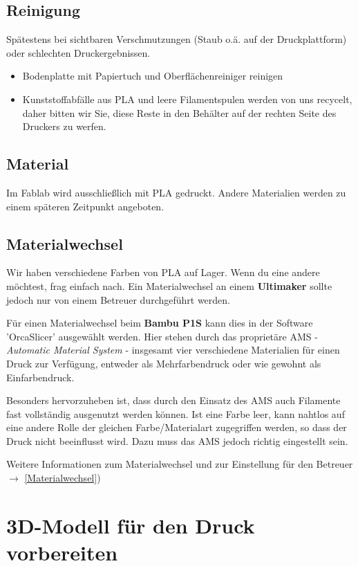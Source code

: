 \documentclass{\basedir/fablab-document}
\begin{document}
\subsection{Reinigung} \label{Reinigung}

Spätestens bei sichtbaren Verschmutzungen (Staub o.ä. auf der Druckplattform) oder schlechten Druckergebnissen.

\begin{itemize}
 \item Bodenplatte mit Papiertuch und Oberflächenreiniger reinigen
 \item Kunststoffabfälle aus PLA und leere Filamentspulen werden von uns recycelt, daher bitten wir Sie, diese Reste in den Behälter auf der rechten Seite des Druckers zu werfen.
\end{itemize}

\subsection{Material}
Im Fablab wird ausschließlich mit PLA gedruckt. Andere Materialien werden zu einem späteren Zeitpunkt angeboten.

\subsection{Materialwechsel}
Wir haben verschiedene Farben von PLA auf Lager. Wenn du eine andere möchtest, frag einfach nach.
Ein Materialwechsel an einem \textbf{Ultimaker} sollte jedoch nur von einem Betreuer durchgeführt werden. 

Für einen Materialwechsel beim \textbf{Bambu P1S} kann dies in der Software 'OrcaSlicer' ausgewählt werden. Hier stehen durch das proprietäre AMS - \textit{Automatic Material System} - insgesamt vier verschiedene Materialien für einen Druck zur Verfügung, entweder als Mehrfarbendruck oder wie gewohnt als Einfarbendruck. 

Besonders hervorzuheben ist, dass durch den Einsatz des AMS auch Filamente fast vollständig ausgenutzt werden können. Ist eine Farbe leer, kann nahtlos auf eine andere Rolle der gleichen Farbe/Materialart zugegriffen werden, so dass der Druck nicht beeinflusst wird. Dazu muss das AMS jedoch richtig eingestellt sein. 

Weitere Informationen zum Materialwechsel und zur Einstellung für den Betreuer $\to$ \ref{Materialwechsel})

\newpage

\section{3D-Modell für den Druck vorbereiten}
\end{document}
